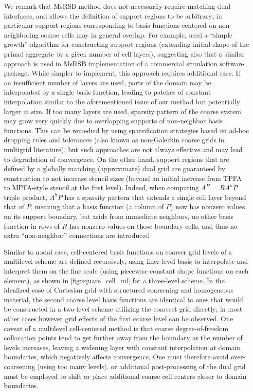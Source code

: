 We remark that MsRSB method does not necessarily require matching dual interfaces, and allows the definition of support regions to be arbitrary; in particular support regions corresponding to basis functions centered on non-neighboring coarse cells may in general overlap.   For example, \cite{Klemetsdal2020} used a ``simple growth'' algorithm for constructing support regions (extending initial shape of the primal aggregate by a given number of cell layers), suggesting also that a similar approach is used in MsRSB implementation of a commercial simulation software package.   While simpler to implement, this approach requires additional care.   If an insufficient number of layers are used, parts of the domain may be interpolated by a single basis function, leading to patches of constant interpolation similar to the aforementioned issue of our method but potentially larger in size.   If too many layers are used, sparsity pattern of the coarse system may grow very quickly due to overlapping supports of non-neighbor basis functions.   This can be remedied by using sparsification strategies based on ad-hoc dropping rules and tolerances (also known as non-Galerkin coarse grids in multigrid literature), but such approaches are not always effective and may lead to degradation of convergence.   On the other hand, support regions that are defined by a globally matching (approximate) dual grid are guaranteed by construction to not increase stencil sizes (beyond an initial increase from TPFA to MPFA-style stencil at the first level).   Indeed, when computing $A^H = RA^hP$ triple product, $A^hP$ has a sparsity pattern that extends a single cell layer beyond that of $P$, meaning that a basis function (a column of $P$) now has nonzero values on its support boundary, but aside from immediate neighbors, no other basis function in rows of $R$ has nonzero values on those boundary cells, and thus no extra ``non-neighbor'' connections are introduced.

Similar to nodal case, cell-centered basis functions on coarser grid levels of a multilevel scheme are defined recursively, using finer-level basis to interpolate and interpret them on the fine scale (using piecewise constant shape functions on each element), as shown in \cref{fig:square_cell_ml} for a three-level scheme.   In the idealized case of Cartesian grid with structured coarsening and homogeneous material, the second coarse level basis functions are identical to ones that would be constructed in a two-level scheme utilizing the coarsest grid directly; in most other cases however grid effects of the first coarse level can be observed.   One caveat of a multilevel cell-centered method is that coarse degree-of-freedom collocation points tend to get further away from the boundary as the number of levels increases, leaving a widening layer with constant interpolation at domain boundaries, which negatively affects convergence.   One must therefore avoid over-coarsening (using too many levels), or additional post-processing of the dual grid must be employed to shift or place additional coarse cell centers closer to domain boundaries.

